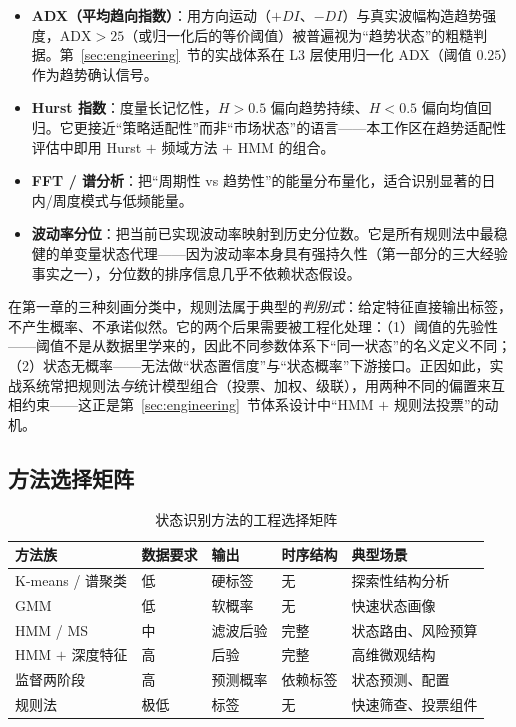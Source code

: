 \begin{itemize}[itemsep=2pt]
\item \textbf{ADX（平均趋向指数）}：用方向运动（$+DI$、$-DI$）与真实波幅构造趋势强度，$\mathrm{ADX} > 25$（或归一化后的等价阈值）被普遍视为“趋势状态”的粗糙判据。第~\ref{sec:engineering}~节的实战体系在 L3 层使用归一化 ADX（阈值 $0.25$）作为趋势确认信号。
\item \textbf{Hurst 指数}：度量长记忆性，$H > 0.5$ 偏向趋势持续、$H < 0.5$ 偏向均值回归。它更接近“策略适配性”而非“市场状态”的语言——本工作区在趋势适配性评估中即用 Hurst $+$ 频域方法 $+$ HMM 的组合。
\item \textbf{FFT / 谱分析}：把“周期性 vs 趋势性”的能量分布量化，适合识别显著的日内/周度模式与低频能量。
\item \textbf{波动率分位}：把当前已实现波动率映射到历史分位数。它是所有规则法中最稳健的单变量状态代理——因为波动率本身具有强持久性（第一部分的三大经验事实之一），分位数的排序信息几乎不依赖状态假设。
\end{itemize}

\begin{remark}
在第一章的三种刻画分类中，规则法属于典型的\emph{判别式}：给定特征直接输出标签，不产生概率、不承诺似然。它的两个后果需要被工程化处理：（1）阈值的先验性——阈值不是从数据里学来的，因此不同参数体系下“同一状态”的名义定义不同；（2）状态无概率——无法做“状态置信度”与“状态概率”下游接口。正因如此，实战系统常把规则法\emph{与}统计模型组合（投票、加权、级联），用两种不同的偏置来互相约束——这正是第~\ref{sec:engineering}~节体系设计中“HMM $+$ 规则法投票”的动机。
\end{remark}

\subsection{方法选择矩阵}

\begin{table}[htbp]
\centering
\footnotesize
\begin{tabular}{>{\raggedright\arraybackslash}p{2.7cm}>{\raggedright\arraybackslash}p{2.3cm}>{\raggedright\arraybackslash}p{2.1cm}>{\raggedright\arraybackslash}p{2.0cm}>{\raggedright\arraybackslash}p{2.1cm}}
\toprule
\textbf{方法族} & \textbf{数据要求} & \textbf{输出} & \textbf{时序结构} & \textbf{典型场景} \\
\midrule
K-means / 谱聚类 & 低 & 硬标签 & 无 & 探索性结构分析 \\
GMM & 低 & 软概率 & 无 & 快速状态画像 \\
HMM / MS & 中 & 滤波后验 & 完整 & 状态路由、风险预算 \\
HMM $+$ 深度特征 & 高 & 后验 & 完整 & 高维微观结构 \\
监督两阶段 & 高 & 预测概率 & 依赖标签 & 状态预测、配置 \\
规则法 & 极低 & 标签 & 无 & 快速筛查、投票组件 \\
\bottomrule
\end{tabular}
\caption{状态识别方法的工程选择矩阵}
\label{tab:method-matrix}
\end{table}

